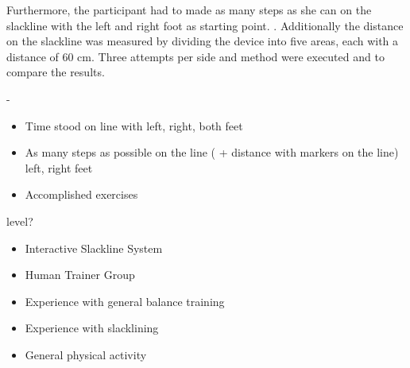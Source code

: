 Furthermore, the participant had to made as many steps as she can on the slackline with the left and right foot as starting point. . Additionally the distance on the slackline was measured by dividing the device into five areas, each with a distance of 60 cm. Three attempts per side and method were executed and  to compare the results.

- 

\begin{itemize}
\item Time stood on line with left, right, both feet
\item As many steps as possible on the line ( + distance with markers on the line) left, right feet
\item Accomplished exercises
\end{itemize}


level?
\begin{itemize}
\item Interactive Slackline System
\item Human Trainer Group
\end{itemize}

\begin{itemize}
\item Experience with general balance training
\item Experience with slacklining
\item General physical activity
\end{itemize}





